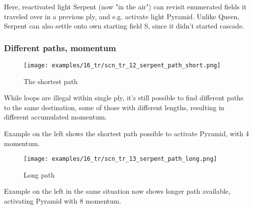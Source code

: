 Here, reactivated light Serpent (now "in the air") can revisit enumerated fields
it traveled over in a previous ply, and e.g. activate light Pyramid.\newline
\indent
Unlike Queen, Serpent can also settle onto own starting field S, since it didn't
started cascade.

\clearpage %

\subsubsection*{Different paths, momentum}
\label{sec:Tamoanchan Revisited/Serpent/Movement/Different paths, momentum}

\vspace*{-0.7\baselineskip}
\noindent
\begin{wrapfigure}[9]{l}{0.4\textwidth}
\centering
\texttt{[image: examples/16\_tr/scn\_tr\_12\_serpent\_path\_short.png]}
\vspace*{-0.5\baselineskip}
\caption{The shortest path}
\label{fig:scn_tr_12_serpent_path_short}
\end{wrapfigure}
While loops are illegal within single ply, it's still possible to find
different paths to the same destination, some of those with different
lengths, resulting in different accumulated momentum.

Example on the left shows the shortest path possible to activate Pyramid,
with 4 momentum.


\vspace*{0.7\baselineskip}
\noindent
\begin{wrapfigure}[4]{l}{0.4\textwidth}
\centering
\texttt{[image: examples/16\_tr/scn\_tr\_13\_serpent\_path\_long.png]}
\vspace*{-0.5\baselineskip}
\caption{Long path}
\label{fig:scn_tr_13_serpent_path_long}
\end{wrapfigure}
Example on the left in the same situation now shows longer path available,
activating Pyramid with 8 momentum.


